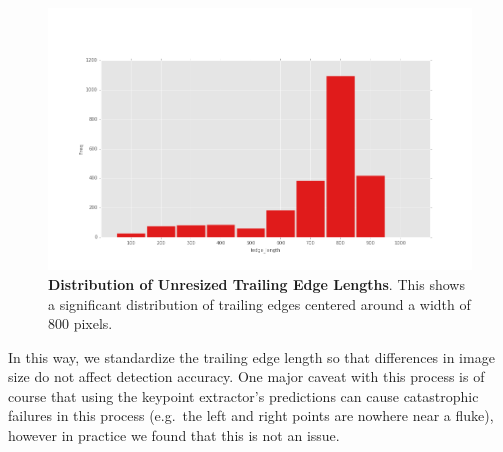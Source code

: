 \begin{figure}[t]%
\centering
\includegraphics[width=1\textwidth]{../images/results/te_size_hist_fb.png}
\caption{\textbf{Distribution of Unresized Trailing Edge Lengths}. This shows a significant distribution of trailing edges centered around a width of 800 pixels.}
\label{fig:width_te_dist}
\end{figure}

In this way, we standardize the trailing edge length so that differences in image size do not affect detection accuracy.
One major caveat with this process is of course that using the keypoint extractor's predictions can cause catastrophic failures in this process (e.g.\ the left and right points are nowhere near a fluke), however in practice we found that this is not an issue.




